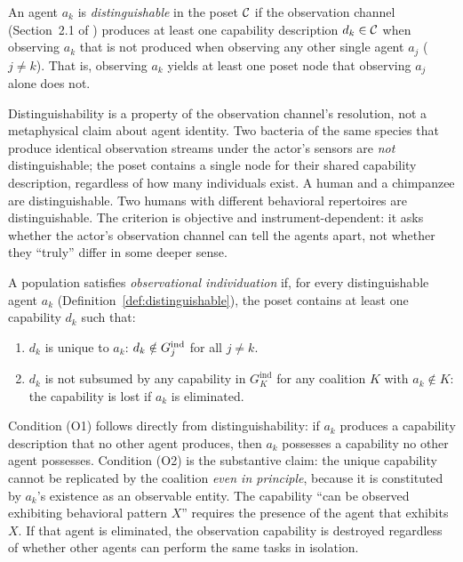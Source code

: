 \begin{definition}
\label{def:distinguishable}
An agent $a_k$ is \emph{distinguishable} in the poset $\mathcal{C}$ if the
    observation channel (Section~2.1 of \citet{lasser2026poset}) produces at
    least one capability description $d_k \in \mathcal{C}$ when observing $a_k$ that
    is not produced when observing any other single agent $a_j$ ($j \neq k$).
    That is, observing $a_k$ yields at least one poset node that observing
    $a_j$ alone does not.
\end{definition}

Distinguishability is a property of the observation channel's resolution,
not a metaphysical claim about agent identity. Two bacteria of the same
species that produce identical observation streams under the actor's sensors
are \emph{not} distinguishable; the poset contains a single node for
their shared capability description, regardless of how many individuals
exist. A human and a chimpanzee are distinguishable. Two humans with
different behavioral repertoires are distinguishable. The criterion is
objective and instrument-dependent: it asks whether the actor's observation
channel can tell the agents apart, not whether they ``truly'' differ in
some deeper sense.

\begin{definition}
\label{def:obs_individuation}
A population satisfies \emph{observational individuation} if, for every
    distinguishable agent $a_k$ (Definition~\ref{def:distinguishable}), the
    poset contains at least one capability $d_k$ such that:
\begin{enumerate}
\item[\textbf{(O1)}] $d_k$ is unique to $a_k$: $d_k \notin G_{j}^{\mathrm{ind}}$ for
    all $j \neq k$.
\item[\textbf{(O2)}] $d_k$ is not subsumed by any capability in
    $G_K^{\mathrm{ind}}$ for any coalition $K$ with $a_k \notin K$: the
    capability is lost if $a_k$ is eliminated.
\end{enumerate}
\end{definition}

Condition (O1) follows directly from distinguishability: if $a_k$ produces
a capability description that no other agent produces, then $a_k$ possesses
a capability no other agent possesses. Condition (O2) is the substantive
claim: the unique capability cannot be replicated by the coalition
\emph{even in principle}, because it is constituted by $a_k$'s existence as
an observable entity. The capability ``can be observed exhibiting behavioral
pattern $X$'' requires the presence of the agent that exhibits $X$. If that
agent is eliminated, the observation capability is destroyed regardless of
whether other agents can perform the same tasks in isolation.

